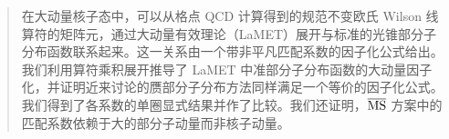 \documentclass[11pt]{ctexart}
\begin{document}
\begin{abstract}
\noindent
在大动量核子态中，可以从格点 QCD 计算得到的规范不变欧氏 Wilson 线算符的矩阵元，通过大动量有效理论（LaMET）展开与标准的光锥部分子分布函数联系起来。这一关系由一个带非平凡匹配系数的因子化公式给出。我们利用算符乘积展开推导了 LaMET 中准部分子分布函数的大动量因子化，并证明近来讨论的赝部分子分布方法同样满足一个等价的因子化公式。我们得到了各系数的单圈显式结果并作了比较。我们还证明，$\overline{\rm MS}$ 方案中的匹配系数依赖于大的部分子动量而非核子动量。
\end{abstract}









\end{document}
